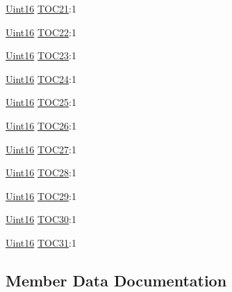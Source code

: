 \begin{DoxyCompactItemize}
\hyperlink{_d_s_p2833x___device_8h_a59a9f6be4562c327cbfb4f7e8e18f08b}{Uint16} \hyperlink{struct_c_a_n_t_o_c___b_i_t_s_aacf49ee4f6b0e90b67d28ef7540e715a}{T\+O\+C21}\+:1
\item 
\hyperlink{_d_s_p2833x___device_8h_a59a9f6be4562c327cbfb4f7e8e18f08b}{Uint16} \hyperlink{struct_c_a_n_t_o_c___b_i_t_s_aeab4ef5ae63609794d47583b3ded910e}{T\+O\+C22}\+:1
\item 
\hyperlink{_d_s_p2833x___device_8h_a59a9f6be4562c327cbfb4f7e8e18f08b}{Uint16} \hyperlink{struct_c_a_n_t_o_c___b_i_t_s_ad9f5360cb2aff3421a139168742592a5}{T\+O\+C23}\+:1
\item 
\hyperlink{_d_s_p2833x___device_8h_a59a9f6be4562c327cbfb4f7e8e18f08b}{Uint16} \hyperlink{struct_c_a_n_t_o_c___b_i_t_s_abbca4ef77e578cf769ae295134e0ee0e}{T\+O\+C24}\+:1
\item 
\hyperlink{_d_s_p2833x___device_8h_a59a9f6be4562c327cbfb4f7e8e18f08b}{Uint16} \hyperlink{struct_c_a_n_t_o_c___b_i_t_s_a155c4bfc0bef179e577ad31d62c10326}{T\+O\+C25}\+:1
\item 
\hyperlink{_d_s_p2833x___device_8h_a59a9f6be4562c327cbfb4f7e8e18f08b}{Uint16} \hyperlink{struct_c_a_n_t_o_c___b_i_t_s_afcb28b88715378437483c7de066b7d54}{T\+O\+C26}\+:1
\item 
\hyperlink{_d_s_p2833x___device_8h_a59a9f6be4562c327cbfb4f7e8e18f08b}{Uint16} \hyperlink{struct_c_a_n_t_o_c___b_i_t_s_ae763d8e6b8775a2807b94dfd6a562089}{T\+O\+C27}\+:1
\item 
\hyperlink{_d_s_p2833x___device_8h_a59a9f6be4562c327cbfb4f7e8e18f08b}{Uint16} \hyperlink{struct_c_a_n_t_o_c___b_i_t_s_aef01ea7843b3181b5e1f511bd9f13f00}{T\+O\+C28}\+:1
\item 
\hyperlink{_d_s_p2833x___device_8h_a59a9f6be4562c327cbfb4f7e8e18f08b}{Uint16} \hyperlink{struct_c_a_n_t_o_c___b_i_t_s_a15f83f2c7ad105081a23836edb0ddca8}{T\+O\+C29}\+:1
\item 
\hyperlink{_d_s_p2833x___device_8h_a59a9f6be4562c327cbfb4f7e8e18f08b}{Uint16} \hyperlink{struct_c_a_n_t_o_c___b_i_t_s_af97d6e613e6f573e0e93f3139b498032}{T\+O\+C30}\+:1
\item 
\hyperlink{_d_s_p2833x___device_8h_a59a9f6be4562c327cbfb4f7e8e18f08b}{Uint16} \hyperlink{struct_c_a_n_t_o_c___b_i_t_s_a4222100e8737435e305dc14f5c96716b}{T\+O\+C31}\+:1
\end{DoxyCompactItemize}


\subsection{Member Data Documentation}
\hypertarget{struct_c_a_n_t_o_c___b_i_t_s_a0960739a790164ffd3af419daf5a6bdc}{}
